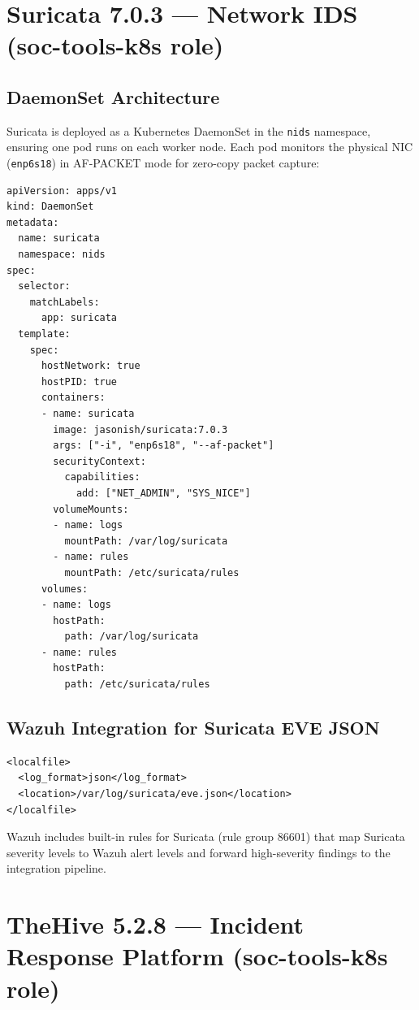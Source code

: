 \documentclass[12pt,a4paper]{report}
\begin{document}
\section{Suricata 7.0.3 --- Network IDS (soc-tools-k8s role)}

\subsection{DaemonSet Architecture}

Suricata is deployed as a Kubernetes DaemonSet in the \texttt{nids} namespace, ensuring one pod runs on each worker node. Each pod monitors the physical NIC (\texttt{enp6s18}) in AF-PACKET mode for zero-copy packet capture:

\begin{lstlisting}[style=yamlstyle, caption=Suricata DaemonSet configuration excerpt, style=yamlstyle]
apiVersion: apps/v1
kind: DaemonSet
metadata:
  name: suricata
  namespace: nids
spec:
  selector:
    matchLabels:
      app: suricata
  template:
    spec:
      hostNetwork: true
      hostPID: true
      containers:
      - name: suricata
        image: jasonish/suricata:7.0.3
        args: ["-i", "enp6s18", "--af-packet"]
        securityContext:
          capabilities:
            add: ["NET_ADMIN", "SYS_NICE"]
        volumeMounts:
        - name: logs
          mountPath: /var/log/suricata
        - name: rules
          mountPath: /etc/suricata/rules
      volumes:
      - name: logs
        hostPath:
          path: /var/log/suricata
      - name: rules
        hostPath:
          path: /etc/suricata/rules
\end{lstlisting}

\subsection{Wazuh Integration for Suricata EVE JSON}

\begin{lstlisting}[style=xmlstyle, caption=Wazuh agent localfile configuration for Suricata]
<localfile>
  <log_format>json</log_format>
  <location>/var/log/suricata/eve.json</location>
</localfile>
\end{lstlisting}

Wazuh includes built-in rules for Suricata (rule group 86601) that map Suricata severity levels to Wazuh alert levels and forward high-severity findings to the integration pipeline.

\section{TheHive 5.2.8 --- Incident Response Platform (soc-tools-k8s role)}
\end{document}
